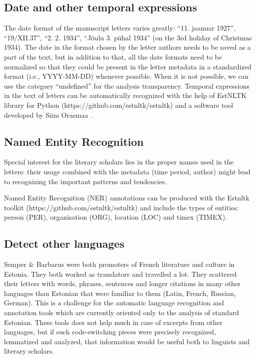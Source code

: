\documentclass[runningheads]{llncs}
\begin{document}
\subsection{Date and other temporal expressions}

The date format of the manuscript letters varies greatly: “11. jaanuar 1927”, “19/XII.37”, “2. 2. 1934”, “Jõulu 3. pühal 1934” (on the 3rd holiday of Christmas 1934). The date in the format chosen by the letter authors needs to be saved as a part of the text, but in addition to that, all the date formats need to be normalized so that they could be present in the letter metadata in a standardized format (i.e., YYYY-MM-DD) whenever possible. When it is not possible, we can use the category “undefined” for the analysis transparency. Temporal expressions in the text of letters can be automatically recognized with the help of EstNLTK library for Python (https://github.com/estnltk/estnltk) and a software tool developed by Siim Orasmaa \cite{ORASMAA14.530}. 

\subsection{Named Entity Recognition}

Special interest for the literary scholars lies in the proper names used in the letters: their usage combined with the metadata (time period, author) might lead to recognizing the important patterns and tendencies. 

Named Entity Recognition (NER) annotations can be produced with the Estnltk toolkit (https://github.com/estnltk/estnltk) and include the types of entities: person (PER), organisation (ORG), location (LOC) and timex (TIMEX). 

\subsection{Detect other languages}

Semper \& Barbarus were both promoters of French literature and culture in Estonia. They both worked as translators and travelled a lot. They scattered their letters with words, phrases, sentences and longer citations in many other languages than Estonian that were familiar to them (Latin, French, Russian, German). This is a challenge for the automatic language recognition and annotation tools which are currently oriented only to the analysis of standard Estonian. These tools does not help much in case of excerpts from other languages, but if such code-switching pieces were precisely recognized, lemmatized and analyzed, that information would be useful both to linguists and literary scholars.
\end{document}
